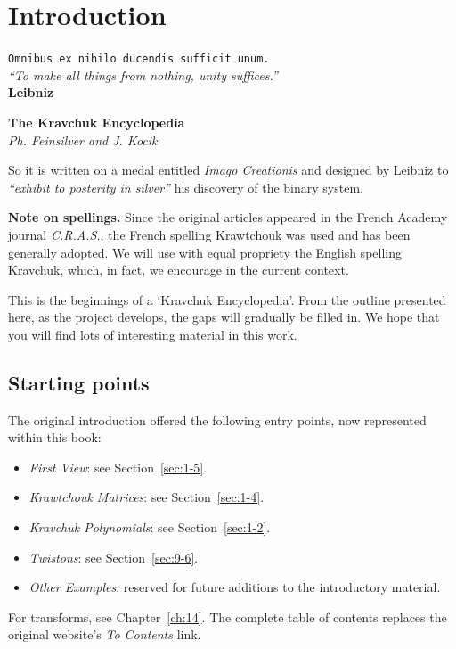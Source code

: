 \chapter{Introduction}
\label{ch:introduction}
\begin{flushright}
\texttt{Omnibus ex nihilo ducendis sufficit unum.}\\
\emph{``To make all things from nothing, unity suffices.''}\\
\textbf{Leibniz}
\end{flushright}
\begin{center}
\textbf{The Kravchuk Encyclopedia}\\
\emph{Ph. Feinsilver and J. Kocik}
\end{center}
So it is written on a medal entitled \emph{Imago Creationis} and designed by Leibniz to \emph{``exhibit to posterity in silver''} his discovery of the binary system.

\medskip
\noindent\textbf{Note on spellings.}
Since the original articles appeared in the French Academy journal \emph{C.R.A.S.}, the French spelling Krawtchouk was used and has been generally adopted. We will use with equal propriety the English spelling Kravchuk, which, in fact, we encourage in the current context.

\medskip
This is the beginnings of a `Kravchuk Encyclopedia'. From the outline presented here, as the project develops, the gaps will gradually be filled in. We hope that you will find lots of interesting material in this work.



\section*{Starting points}
The original introduction offered the following entry points, now represented within this book:
\begin{itemize}
\item \emph{First View}: see Section~\ref{sec:1-5}.
\item \emph{Krawtchouk Matrices}: see Section~\ref{sec:1-4}.
\item \emph{Kravchuk Polynomials}: see Section~\ref{sec:1-2}.
\item \emph{Twistons}: see Section~\ref{sec:9-6}.
\item \emph{Other Examples}: reserved for future additions to the introductory material.
\end{itemize}
For transforms, see Chapter~\ref{ch:14}. The complete table of contents replaces the original website's \emph{To Contents} link.

